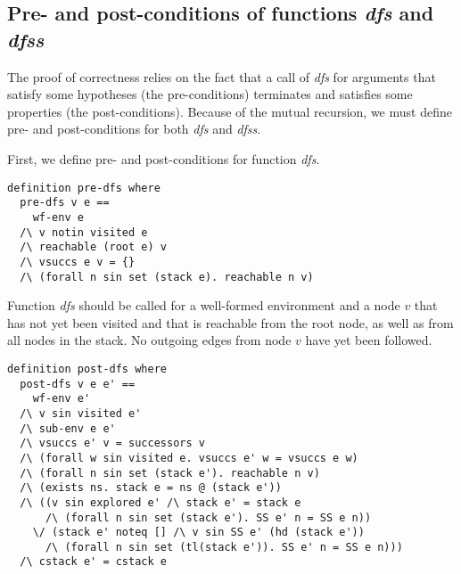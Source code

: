 \documentclass[sigplan,10pt,anonymous,review]{acmart}
\newcommand{\prog}[1]{\textit{#1}}
\begin{document}
\subsection{Pre- and post-conditions of functions \prog{dfs} and \prog{dfss}}
\label{sec:pre-post}

The proof of correctness relies on the fact that a call of \prog{dfs} for arguments that satisfy some hypotheses (the pre-conditions) terminates and satisfies some properties (the post-conditions). Because of the mutual recursion, we must define pre- and post-conditions for both \prog{dfs} and \prog{dfss}.

First, we define pre- and post-conditions for function \prog{dfs}.

\begin{small}
\begin{lstlisting}[language=isabelle]
definition pre-dfs where 
  pre-dfs v e ==
    wf-env e
  /\ v notin visited e
  /\ reachable (root e) v
  /\ vsuccs e v = {}
  /\ (forall n sin set (stack e). reachable n v)
\end{lstlisting}
\end{small}

Function \prog{dfs} should be called for a well-formed environment and a node $v$ that has not yet been visited and that is reachable from the root node, as well as from all nodes in the stack. No outgoing edges from node $v$ have yet been followed.

\begin{small}
  \begin{lstlisting}[language=isabelle]
definition post-dfs where 
  post-dfs v e e' ==
    wf-env e'
  /\ v sin visited e'
  /\ sub-env e e'
  /\ vsuccs e' v = successors v
  /\ (forall w sin visited e. vsuccs e' w = vsuccs e w)
  /\ (forall n sin set (stack e'). reachable n v)
  /\ (exists ns. stack e = ns @ (stack e'))
  /\ ((v sin explored e' /\ stack e' = stack e 
      /\ (forall n sin set (stack e'). SS e' n = SS e n)) 
    \/ (stack e' noteq [] /\ v sin SS e' (hd (stack e')) 
      /\ (forall n sin set (tl(stack e')). SS e' n = SS e n)))
  /\ cstack e' = cstack e
  \end{lstlisting}
  \end{small}
\end{document}
